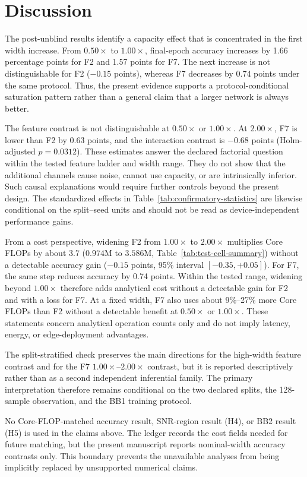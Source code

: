 \section{Discussion}
\label{sec:discussion}
The post-unblind results identify a capacity effect that is concentrated in the
first width increase. From $0.50\times$ to $1.00\times$, final-epoch accuracy
increases by 1.66 percentage points for F2 and 1.57 points for F7. The next
increase is not distinguishable for F2 ($-0.15$ points), whereas F7 decreases
by 0.74 points under the same protocol. Thus, the present evidence supports a
protocol-conditional saturation pattern rather than a general claim that a
larger network is always better.

The feature contrast is not distinguishable at $0.50\times$ or $1.00\times$.
At $2.00\times$, F7 is lower than F2 by 0.63 points, and the interaction
contrast is $-0.68$ points (Holm-adjusted $p=0.0312$). These estimates answer the
declared factorial question within the tested feature ladder and width range.
They do not show that the additional channels cause noise, cannot use capacity,
or are intrinsically inferior. Such causal explanations would require further
controls beyond the present design. The standardized effects in
Table~\ref{tab:confirmatory-statistics} are likewise conditional on the
split--seed units and should not be read as device-independent performance
gains.

From a cost perspective, widening F2 from $1.00\times$ to $2.00\times$ multiplies Core
FLOPs by about 3.7 ($0.974$M to $3.586$M, Table~\ref{tab:test-cell-summary})
without a detectable accuracy gain ($-0.15$ points, 95\% interval
$[-0.35,+0.05]$). For F7, the same step reduces accuracy by 0.74 points.
Within the tested range, widening beyond $1.00\times$ therefore adds
analytical cost without a detectable gain for F2 and with a loss for F7. At a
fixed width, F7 also uses about 9\%--27\% more Core FLOPs than F2 without a
detectable benefit at $0.50\times$ or $1.00\times$. These statements concern
analytical operation counts only and do not imply latency, energy, or
edge-deployment advantages.

The split-stratified check preserves the main directions for the high-width
feature contrast and for the F7 $1.00\times$--$2.00\times$ contrast, but it is
reported descriptively rather than as a second independent inferential family.
The primary interpretation therefore remains conditional on the two declared
splits, the 128-sample observation, and the BB1 training protocol.

No Core-FLOP-matched accuracy result, SNR-region result (H4), or BB2 result
(H5) is used in the claims above. The ledger records the cost fields needed for
future matching, but the present manuscript reports nominal-width accuracy
contrasts only. This boundary prevents the unavailable analyses from being
implicitly replaced by unsupported numerical claims.
